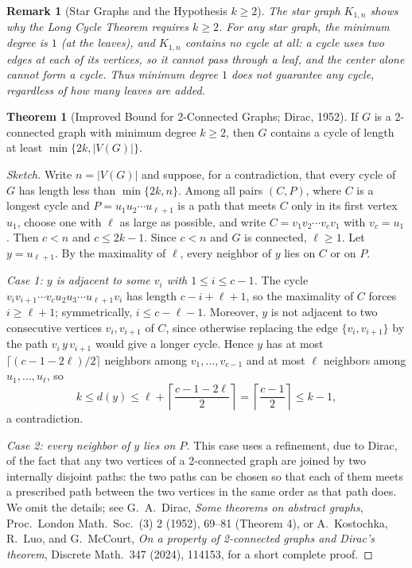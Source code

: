 \documentclass{article}
\newtheorem{remark}{Remark}
\theoremstyle{definition}
\newtheorem{theorem}{Theorem}
\begin{document}
\begin{remark}[Star Graphs and the Hypothesis $k \geq 2$]
The star graph $K_{1,n}$ shows why the Long Cycle Theorem requires $k \geq 2$. For any star graph, the minimum degree is $1$ (at the leaves), and $K_{1,n}$ contains no cycle at all: a cycle uses two edges at each of its vertices, so it cannot pass through a leaf, and the center alone cannot form a cycle. Thus minimum degree $1$ does not guarantee any cycle, regardless of how many leaves are added.
\end{remark}

\begin{theorem}[Improved Bound for 2-Connected Graphs; Dirac, 1952]
If $G$ is a 2-connected graph with minimum degree $k \geq 2$, then $G$ contains a cycle of length at least $\min\{2k, |V(G)|\}$.
\end{theorem}

\begin{proof}[Sketch]
Write $n = |V(G)|$ and suppose, for a contradiction, that every cycle of $G$ has length less than $\min\{2k, n\}$. Among all pairs $(C, P)$, where $C$ is a longest cycle and $P = u_1 u_2 \cdots u_{\ell+1}$ is a path that meets $C$ only in its first vertex $u_1$, choose one with $\ell$ as large as possible, and write $C = v_1 v_2 \cdots v_c v_1$ with $v_c = u_1$. Then $c < n$ and $c \leq 2k-1$. Since $c < n$ and $G$ is connected, $\ell \geq 1$. Let $y = u_{\ell+1}$. By the maximality of $\ell$, every neighbor of $y$ lies on $C$ or on $P$.

\emph{Case 1: $y$ is adjacent to some $v_i$ with $1 \leq i \leq c-1$.} The cycle $v_i v_{i+1} \cdots v_c u_2 u_3 \cdots u_{\ell+1} v_i$ has length $c-i+\ell+1$, so the maximality of $C$ forces $i \geq \ell+1$; symmetrically, $i \leq c-\ell-1$. Moreover, $y$ is not adjacent to two consecutive vertices $v_i, v_{i+1}$ of $C$, since otherwise replacing the edge $\{v_i, v_{i+1}\}$ by the path $v_i\, y\, v_{i+1}$ would give a longer cycle. Hence $y$ has at most $\lceil (c-1-2\ell)/2 \rceil$ neighbors among $v_1, \ldots, v_{c-1}$ and at most $\ell$ neighbors among $u_1, \ldots, u_\ell$, so
\[
k \leq d(y) \leq \ell + \left\lceil \frac{c-1-2\ell}{2} \right\rceil = \left\lceil \frac{c-1}{2} \right\rceil \leq k-1,
\]
a contradiction.

\emph{Case 2: every neighbor of $y$ lies on $P$.} This case uses a refinement, due to Dirac, of the fact that any two vertices of a 2-connected graph are joined by two internally disjoint paths: the two paths can be chosen so that each of them meets a prescribed path between the two vertices in the same order as that path does. We omit the details; see G.~A.~Dirac, \emph{Some theorems on abstract graphs}, Proc.\ London Math.\ Soc.\ (3) 2 (1952), 69--81 (Theorem 4), or A.~Kostochka, R.~Luo, and G.~McCourt, \emph{On a property of 2-connected graphs and Dirac's theorem}, Discrete Math.\ 347 (2024), 114153, for a short complete proof.
\end{proof}
\end{document}
